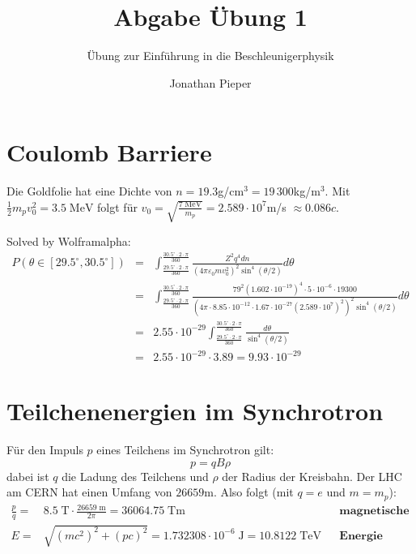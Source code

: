 \documentclass[12pt,DIV=15,a4paper,twoside,draft=false]{scrartcl}
\author{Jonathan Pieper}
\title{Abgabe Übung 1}
\subtitle{Übung zur Einführung in die Beschleunigerphysik}
\begin{document}
\maketitle
{}

\section{Coulomb Barriere}
Die Goldfolie hat eine Dichte von $n=19.3$\;g/cm$^{3} = 19\,{}300$\;kg/m$^3$. Mit $\frac{1}{2} m_p v_0^2 = 3.5\;\mathrm{MeV}$ folgt für $v_0 = \sqrt{\frac{7\;\mathrm{MeV}}{m_p}} = 2.589\cdot 10^7$\;m/s ${}\approx 0.086 c$.

Solved by Wolframalpha:
\begin{eqnarray*}
P(θ∈[29.5^\circ , 30.5^{\circ}]) &=&
 ∫_{\frac{29.5^\circ \cdot 2 \cdot \pi}{360}}^{\frac{30.5^{\circ} \cdot 2 \cdot \pi}{360}}
\frac{Z^2 q^4 d n}{(4 \pi ε_0 m v_0^2)^2 \sin^4(θ/2)} dθ\\
&=& ∫_{\frac{29.5^\circ \cdot 2 \cdot \pi}{360}}^{\frac{30.5^{\circ} \cdot 2 \cdot \pi}{360}}
 \frac{79^2 (1.602\cdot 10^{-19})^4 \cdot 5\cdot 10^{-6} \cdot  19300}{(4 \pi \cdot 8.85 \cdot 10^{-12}\cdot  1.67\cdot 10^{-27} (2.589\cdot 10^7)^2)^2 \sin^4(θ/2)} dθ\\ %
&=& 2.55\cdot 10^{-29} ∫_{\frac{29.5^\circ \cdot 2 \cdot \pi}{360}}^{\frac{30.5^{\circ} \cdot 2 \cdot \pi}{360}}
\frac{dθ}{\sin^4(θ/2)}\\
& = & 2.55 \cdot 10^{-29} \cdot 3.89 = 9.93 \cdot 10^{-29}
\end{eqnarray*}


\section{Teilchenenergien im Synchrotron}
Für den Impuls $p$ eines Teilchens im Synchrotron gilt:
$$ p = q B ρ $$
dabei ist $q$ die Ladung des Teilchens und $ρ$ der Radius der Kreisbahn. Der LHC am CERN hat einen Umfang von ${26659}$\;m. Also folgt (mit $q=e$ und $m=m_p$):
\begin{align*}
\frac{p}{q} =& 8.5\;\mathrm{T} \cdot \frac{26659\;\mathrm{m}}{2π} = 36064.75\;\mathrm{Tm} &&\textbf{magnetische Steifigkeit}\\
E =& \sqrt{(m c^2)^2 + (pc)^2} = 1.732308 \cdot 10^{-6}\;\mathrm{J} = 
10.8122\;\mathrm{TeV} && \textbf{Energie}
\end{align*}
\end{document}
